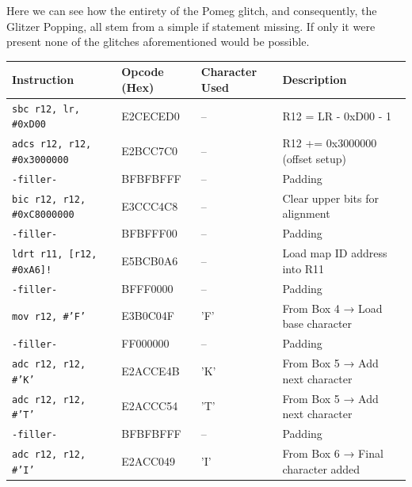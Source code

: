 \documentclass[a4paper]{usiinfbachelorproject}
\begin{document}
Here we can see how the entirety of the Pomeg glitch, and consequently, the Glitzer Popping, all stem from a simple if statement missing. If only it were present none of the glitches aforementioned would be possible.

\begin{table}[htbp]
	\begin{tabular}{|l|l|l|p{6cm}|}
		\hline
		\textbf{Instruction}                & \textbf{Opcode (Hex)} & \textbf{Character Used} & \textbf{Description}               \\
		\hline
		\texttt{sbc r12, lr, \#0xD00}       & E2CECED0              & --                      & R12 = LR - 0xD00 - 1               \\
		\texttt{adcs r12, r12, \#0x3000000} & E2BCC7C0              & --                      & R12 += 0x3000000 (offset setup)    \\
		\texttt{-filler-}                   & BFBFBFFF              & --                      & Padding                            \\
		\texttt{bic r12, r12, \#0xC8000000} & E3CCC4C8              & --                      & Clear upper bits for alignment     \\
		\texttt{-filler-}                   & BFBFFF00              & --                      & Padding                            \\
		\texttt{ldrt r11, [r12, \#0xA6]!}   & E5BCB0A6              & --                      & Load map ID address into R11       \\
		\texttt{-filler-}                   & BFFF0000              & --                      & Padding                            \\
		\texttt{mov r12, \#'F'}             & E3B0C04F              & 'F'                     & From Box 4 → Load base character   \\
		\texttt{-filler-}                   & FF000000              & --                      & Padding                            \\
		\texttt{adc r12, r12, \#'K'}        & E2ACCE4B              & 'K'                     & From Box 5 → Add next character    \\
		\texttt{adc r12, r12, \#'T'}        & E2ACCC54              & 'T'                     & From Box 5 → Add next character    \\
		\texttt{-filler-}                   & BFBFBFFF              & --                      & Padding                            \\
		\texttt{adc r12, r12, \#'I'}        & E2ACC049              & 'I'                     & From Box 6 → Final character added \\

\end{tabular}
\end{table}
\end{document}
